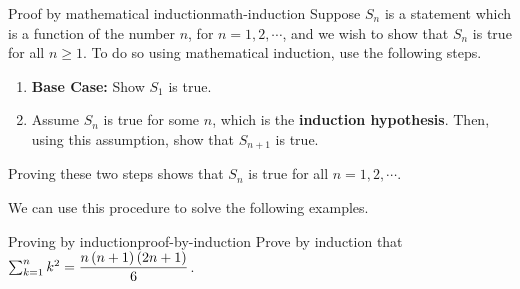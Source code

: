 \begin{procedure}{Proof by mathematical induction}{math-induction}
Suppose $S_{n}$ is a statement which is a function of the number $n$, for $n=1,2,\cdots$, and
we wish to show that $S_{n}$ is true for all $n \geq 1$. To do so using mathematical induction, use the 
following steps.
\begin{enumerate}
\item \textbf{Base Case:} Show $S_{1}$ is true.

\item Assume $S_{n}$ is true for some $n$, which is the \textbf{induction hypothesis}. Then, using this assumption, 
show that $S_{n+1}$ is true. 
\end{enumerate}

Proving these two steps shows that $S_{n}$ is true for all $n = 1,2,\cdots$.
\end{procedure}

We can use this procedure to solve the following examples.

\begin{example}{Proving by induction}{proof-by-induction}
Prove by induction that $\sum_{k=1}^{n}k^{2}=\displaystyle
\frac{n\left(n+1\right) \left(2n+1\right) }{6}$.
\end{example}

